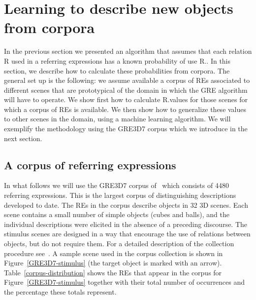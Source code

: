 \section{Learning to describe new objects from corpora}\label{sec:learning}

In the previous section we presented an algorithm that assumes that each relation R used in a referring expressions has a known probability of use R.\puse. In this section, we describe how to calculate these probabilities from corpora.  The general set up is the following: we assume available a corpus of REs associated to different scenes that are prototypical of the domain in which the GRE algorithm will have to operate.   We show first how to calculate R.\puse values for those scenes for which a corpus of REs is available.  We then show how to generalize these values to 
other scenes in the domain, using a machine learning algorithm.   We will exemplify the methodology using the GRE3D7 corpus which we introduce in the next section. 

\subsection{A corpus of referring expressions}

In what follows we will use the GRE3D7 corpus of~ which consists of 4480 referring expressions. This is the largest corpus of distinguishing descriptions developed to date. The REs in the corpus describe objects in 32 3D scenes. Each scene contains a small number of simple objects (cubes and balls), and the individual descriptions were elicited in the absence of a preceding discourse. The stimulus scenes are designed in a way that encourage the use of relations between objects, but do not require them. For a detailed description of the collection procedure see~\cite[Chapter 5]{viet:gene11}. A sample scene used in the corpus collection is shown in Figure~\ref{GRE3D7-stimulus} (the target object is marked with an arrow). Table~\ref{corpus-distribution} shows the REs that appear in the corpus for Figure~\ref{GRE3D7-stimulus} together with their total number of occurrences and the percentage these totals represent.  

